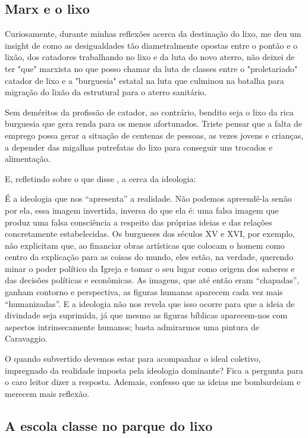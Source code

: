 \subsection{Marx e o lixo}

Curiosamente, durante minhas reflexões acerca da destinação do lixo, me deu um insight de como as desigualdades tão diametralmente opostas entre o pontão e o lixão, dos catadores trabalhando no lixo e da luta do novo aterro, não deixei de ter "que" marxista no que posso chamar da luta de classes entre o "proletariado" catador de lixo e a "burguesia" estatal na luta que culminou na batalha para migração do lixão da estrutural para o aterro sanitário.

Sem deméritos da profissão de catador, ao contrário, bendito seja o lixo da rica burguesia que gera renda para os menos afortunados. Triste pensar que a falta de emprego possa gerar a situação de centenas de pessoas, as vezes jovens e crianças, a depender das migalhas putrefatas do lixo para conseguir uns trocados e alimentação.

E, refletindo sobre o que disse \cite{Balieiro2014}, a cerca da ideologia:
\begin{citacao}
    É a ideologia que nos “apresenta” a realidade. Não podemos apreendê-la senão
    por ela, essa imagem invertida, inversa do que ela é: uma falsa imagem que produz
    uma falsa consciência a respeito das próprias ideias e das relações concretamente
    estabelecidas. Os burgueses dos séculos XV e XVI, por exemplo, não explicitam
    que, ao financiar obras artísticas que colocam o homem como centro da explicação
    para as coisas do mundo, eles estão, na verdade, querendo minar o poder político
    da Igreja e tomar o seu lugar como origem dos saberes e das decisões políticas
    e econômicas. As imagens, que até então eram “chapadas”, ganham contorno e
    perspectiva, as figuras humanas aparecem cada vez mais “humanizadas”. E a ideologia
    não nos revela que isso ocorre para que a ideia de divindade seja suprimida,
    já que mesmo as figuras bíblicas aparecem-nos com aspectos intrinsecamente humanos;
    basta admirarmos uma pintura de Caravaggio.
\end{citacao}

O quando subvertido devemos estar para acompanhar o ideal coletivo, impregnado da realidade imposta pela ideologia dominante? Fica a pergunta para o caro leitor dizer a resposta. Ademais, confesso que as ideias me bombardeiam e merecem mais reflexão.

\subsection{A escola classe no parque do lixo}

